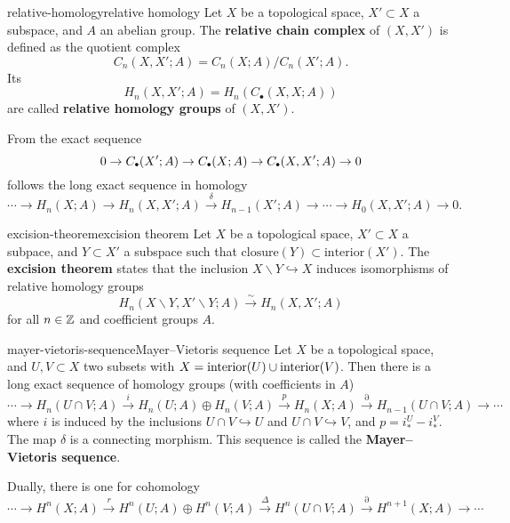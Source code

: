 \begin{topic}{relative-homology}{relative homology}
    Let $X$ be a topological space, $X' \subset X$ a subspace, and $A$ an abelian group. The \textbf{relative chain complex} of $(X, X')$ is defined as the quotient complex
    \[ C_n(X, X'; A) = C_n(X; A) / C_n(X'; A) .  \]
    Its 
    \[ H_n(X, X'; A) = H_n(C_\bullet(X, X; A)) \]
    are called \textbf{relative homology groups} of $(X, X')$.
    
    From the exact sequence
    \[ 0 \to C_\bdot(X'; A) \to C_\bdot(X; A) \to C_\bdot(X, X'; A) \to 0 \]
    follows the long exact sequence in homology
    \[ \cdots \to H_n(X; A) \to H_n(X, X'; A) \xrightarrow{\delta} H_{n - 1}(X'; A) \to \cdots \to H_0(X, X'; A) \to 0 . \]
\end{topic}

\begin{topic}{excision-theorem}{excision theorem}
    Let $X$ be a topological space, $X' \subset X$ a subpace, and $Y \subset X'$ a subspace such that $\text{closure}(Y) \subset \text{interior}(X')$. The \textbf{excision theorem} states that the inclusion $X \backslash Y \hookrightarrow X$ induces isomorphisms of relative homology groups
    \[ H_n(X \backslash Y, X' \backslash Y; A) \xrightarrow{\sim} H_n(X, X'; A) \]
    for all $n \in \mathbb{Z}$ and coefficient groups $A$.
\end{topic}

\begin{topic}{mayer-vietoris-sequence}{Mayer–Vietoris sequence}
    Let $X$ be a topological space, and $U, V \subset X$ two subsets with $X = \textup{interior}(U) \cup \textup{interior}(V)$. Then there is a long exact sequence of homology groups (with coefficients in $A$)
    \[ \cdots \longrightarrow H_n(U \cap V; A) \overset{i}{\longrightarrow} H_n(U; A) \oplus H_n(V; A) \overset{p}{\longrightarrow} H_n(X; A) \overset{\partial}{\longrightarrow} H_{n - 1}(U \cap V; A) \longrightarrow \cdots \]
    where $i$ is induced by the inclusions $U \cap V \hookrightarrow U$ and $U \cap V \hookrightarrow V$, and $p = i_*^U - i_*^V$. The map $\delta$ is a connecting morphism. This sequence is called the \textbf{Mayer–Vietoris sequence}.
    
    Dually, there is one for cohomology
    \[ \cdots \longrightarrow H^n(X; A) \overset{r}{\longrightarrow} H^n(U; A) \oplus H^n(V; A) \overset{\Delta}{\longrightarrow} H^n(U \cap V; A) \overset{\partial}{\longrightarrow} H^{n + 1}(X; A) \longrightarrow \cdots \]
\end{topic}

